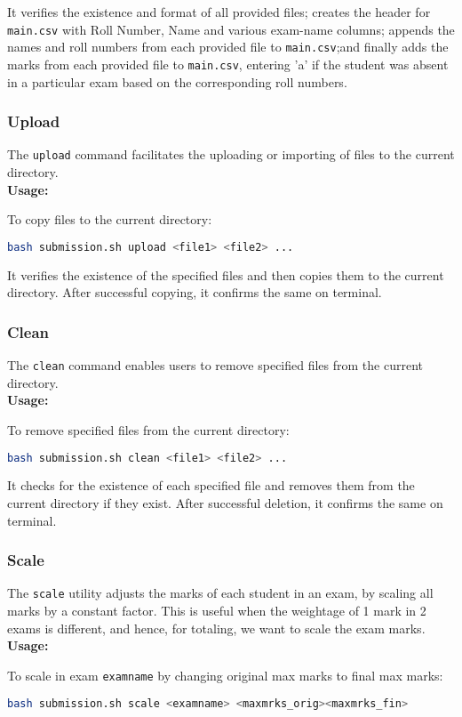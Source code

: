 \documentclass{article}
\begin{document}
It verifies the existence and format of all provided files; creates the header for \texttt{main.csv} with Roll Number, Name and various exam-name columns; appends the names and roll numbers from each provided file to \texttt{main.csv};and finally adds the marks from each provided file to \texttt{main.csv}, entering 'a' if the student was absent in a particular exam based on the corresponding roll numbers.

\subsubsection{Upload}
The \texttt{upload} command facilitates the uploading or importing of files to the current directory.\\
\textbf{Usage:}
\begin{adjustwidth}{0.5cm}{0cm}
To copy files to the current directory:
\begin{lstlisting}[language=bash]
bash submission.sh upload <file1> <file2> ...
\end{lstlisting}
\end{adjustwidth}

It verifies the existence of the specified files and then copies them to the current directory. After successful copying, it confirms the same on terminal.

\subsubsection{Clean}
The \texttt{clean} command enables users to remove specified files from the current directory.\\
\textbf{Usage:}
\begin{adjustwidth}{0.5cm}{0cm}
To remove specified files from the current directory:
\begin{lstlisting}[language=bash]
bash submission.sh clean <file1> <file2> ...
\end{lstlisting}
\end{adjustwidth}

It checks for the existence of each specified file and removes them from the current directory if they exist. After successful deletion, it confirms the same on terminal.

\subsubsection{Scale}
The \texttt{scale} utility adjusts the marks of each student in an exam, by scaling all marks by a constant factor. This is useful when the weightage of 1 mark in 2 exams is different, and hence, for totaling, we want to scale the exam marks.\\
\textbf{Usage:}
\begin{adjustwidth}{0.5cm}{0cm}
To scale in exam \texttt{examname} by changing original max marks to final max marks:
\begin{lstlisting}[language=bash]
bash submission.sh scale <examname> <maxmrks_orig><maxmrks_fin>
\end{lstlisting}
\end{adjustwidth}
\end{document}
